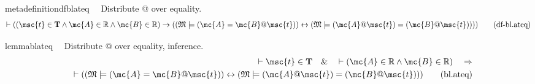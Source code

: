 \begin{restatable}{metadefinition}{dfblateq}~~ Distribute @ over equality.
\begin{align}
\vdash ( ( \msc{t} \in \mathbf{T} \wedge \mc{A} \in \mathbb{R} \wedge \mc{B}
    \in \mathbb{R} ) \rightarrow ( ( \mathfrak{M} \models ( \mc{A} = \mc{B} @
    \msc{t} ) ) \leftrightarrow ( \mathfrak{M} \models ( \mc{A} @ \msc{t} ) = (
    \mc{B} @ \msc{t} ) ) ) )\label{eq:df-bl.ateq}\tag{df-bl.ateq}
\end{align}
\end{restatable}

\begin{restatable}{lemma}{blateq}~~ Distribute @ over equality, inference.
\begin{align}
\vdash \msc{t} \in \mathbf{T}\quad\&\quad \vdash ( \mc{A} \in \mathbb{R} \wedge
    \mc{B} \in \mathbb{R} )\quad\Rightarrow \notag \\ 
	\quad \vdash ( ( \mathfrak{M}
    \models ( \mc{A} = \mc{B} @ \msc{t} ) ) \leftrightarrow ( \mathfrak{M}
    \models ( \mc{A} @ \msc{t} ) = ( \mc{B} @ \msc{t} ) )
    )\label{eq:bl.ateq}\tag{bl.ateq}
\end{align}
\end{restatable}

